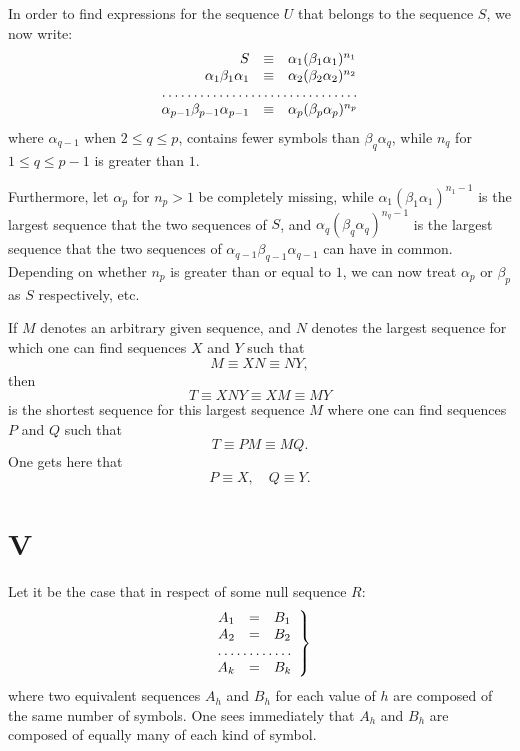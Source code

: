 In order to find expressions for the sequence $U$ that belongs to the
sequence $S$, we now write:
$$\begin{array}{rcl}
S &\equiv& \alpha_1(\beta_1 \alpha_1)^{n_1} \\
\alpha_1 \beta_1 \alpha_1 &\equiv& \alpha_2(\beta_2 \alpha_2)^{n_2} \\
\hdotsfor{3}\\
\alpha_{p-1} \beta_{p-1} \alpha_{p-1} &\equiv& \alpha_p(\beta_p \alpha_p)^{n_p} \\
\end{array}$$
where $\alpha_{q-1}$ when $2 \leq q \leq p$, contains fewer symbols
than $\beta_q \alpha_q$, while $n_q$ for $1 \leq q \leq p-1$ is
greater than $1$.

Furthermore, let $\alpha_p$ for $n_p > 1$ be completely
missing,
while
$\alpha_1(\beta_1 \alpha_1)^{n_1-1}$ is the largest sequence that the
two sequences of $S$, and $\alpha_q(\beta_q \alpha_q)^{n_q-1}$ is the
largest sequence that the two sequences of $\alpha_{q-1} \beta_{q-1}
\alpha_{q-1}$ can have in common. 
Depending on whether $n_p$ is greater than or equal to $1$, we can now
treat $\alpha_p$ or $\beta_p$ as $S$ respectively, etc.

\bigskip

If $M$ denotes an arbitrary given sequence, and $N$ denotes the
largest sequence for which one can find sequences $X$ and $Y$ such
that
$$M \equiv XN \equiv NY,$$
then 
$$T \equiv XNY \equiv XM \equiv MY$$
is the shortest sequence for this largest sequence $M$ where
one can find sequences $P$ and $Q$ such that
$$T \equiv PM \equiv MQ.$$
One gets here that
$$P \equiv X, \quad Q \equiv Y.$$


\section{V}

Let it be the case that in respect of some null sequence $R$:
\begin{equation}
\left.\begin{array}{rcl}
A_1 & = & B_1\\
A_2 & = & B_2\\
\hdotsfor{3}\\
A_k & = & B_k\\
\end{array}\right\} 
\label{eq:one}
\end{equation}
where two equivalent sequences $A_h$ and $B_h$ for each value of $h$
are composed of the same number of symbols.  One sees immediately that 
 $A_h$ and $B_h$ are composed of equally many of each kind of symbol.


